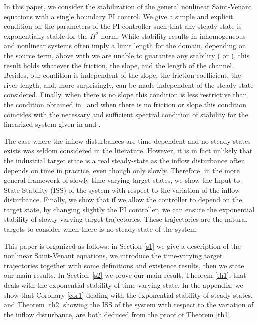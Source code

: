 In this paper, we consider the stabilization of the general nonlinear Saint-Venant equations with a single boundary PI control.
We give a simple and explicit condition on the parameters of the PI controller such that any steady-state
is exponentially stable for the $H^{2}$ norm.
While stability results in inhomogeneous and nonlinear systems often imply a limit length for the domain, depending on the source term, above with we are unable to guarantee any stability (\cite{C1,C1_22,BastinCoron22,dos2008} or \cite[Chap.\,6]{BastinCoron1D}),
this result holds whatever the friction, the slope, and the length of the channel.
Besides, our condition is independent of the slope, the friction coefficient, the river length, and, more surprisingly, {can be made independent of }the steady-state considered.
Finally, when there is no slope this condition is less restrictive than the condition obtained in~\cite{BastinCoronPI}
and when there is no friction or slope this condition coincides with the {necessary and sufficient} spectral condition of stability for the linearized system given in \cite{BastinCoronTamasoiu2015} and \cite[Th.\,2.7]{BastinCoron1D}.\enlargethispage{.5\baselineskip}

The case where the inflow disturbances are time dependent and no steady-states exists was seldom considered in the literature.
However, it is in fact unlikely that the industrial target state is a real steady-state as the inflow disturbance often depends on time in practice,
even though only slowly.
Therefore,
in the more general framework of slowly time-varying target states,
we show the Input-to-State Stability (ISS) of the system with respect to the variation of the inflow disturbance.
Finally, we show that if
we allow the controller to depend on the target state,
by changing slightly the PI controller,
we can ensure
the exponential stability of slowly-varying target trajectories. {These trajectories} are the natural {targets} to consider when there is no steady-state of the system.

This paper is organized as follows: in Section \ref{s1} we give a description of the nonlinear Saint-Venant equations, we introduce the time-varying target trajectories together with some definitions and existence results, then we state our main results.
In Section~\ref{s2} we prove our main result, Theorem \ref{th1}, that deals with the exponential stability of time-varying state.
In the appendix, we show that Corollary \ref{cor1} dealing with the exponential stability of steady-states,
and Theorem \ref{th2} showing the ISS of the system with respect to the variation of the inflow disturbance,
are both deduced from the proof of Theorem \ref{th1}.

